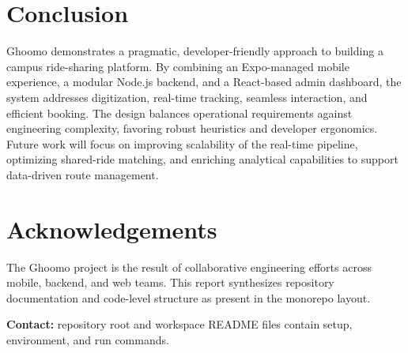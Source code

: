 \documentclass[12pt,a4paper]{article}
\begin{document}
\section{Conclusion}
Ghoomo demonstrates a pragmatic, developer-friendly approach to building a campus ride-sharing platform. By combining an Expo-managed mobile experience, a modular Node.js backend, and a React-based admin dashboard, the system addresses digitization, real-time tracking, seamless interaction, and efficient booking. The design balances operational requirements against engineering complexity, favoring robust heuristics and developer ergonomics. Future work will focus on improving scalability of the real-time pipeline, optimizing shared-ride matching, and enriching analytical capabilities to support data-driven route management.

\section*{Acknowledgements}
The Ghoomo project is the result of collaborative engineering efforts across mobile, backend, and web teams. This report synthesizes repository documentation and code-level structure as present in the monorepo layout.

\vfill
\noindent\textbf{Contact:} repository root and workspace README files contain setup, environment, and run commands.
\end{document}
